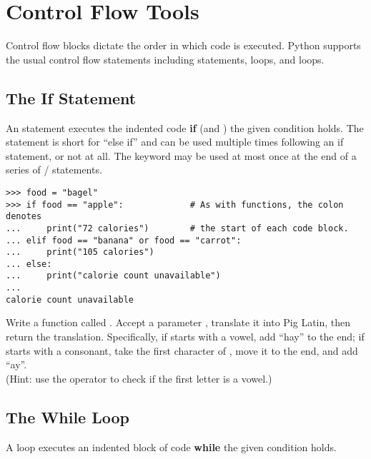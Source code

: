 \section*{Control Flow Tools} %

Control flow blocks dictate the order in which code is executed.
Python supports the usual control flow statements including  statements,  loops, and  loops.

\subsection*{The If Statement} %

An  statement executes the indented code \textbf{if} (and ) the given condition holds.
The  statement is short for ``else if'' and can be used multiple times following an if statement, or not at all.
The  keyword may be used at most once at the end of a series of / statements.

\begin{lstlisting}
>>> food = "bagel"
>>> if food == "apple":             # As with functions, the colon denotes
...     print("72 calories")        # the start of each code block.
... elif food == "banana" or food == "carrot":
...     print("105 calories")
... else:
...     print("calorie count unavailable")
...
calorie count unavailable
\end{lstlisting}

\begin{problem} %
Write a function called .
Accept a parameter , translate it into Pig Latin, then return the translation.
Specifically, if  starts with a vowel, add ``hay'' to the end; if  starts with a consonant, take the first character of , move it to the end, and add ``ay''.
\\
(Hint: use the  operator to check if the first letter is a vowel.)
\end{problem}

\subsection*{The While Loop} %

A  loop executes an indented block of code \textbf{while} the given condition holds.

